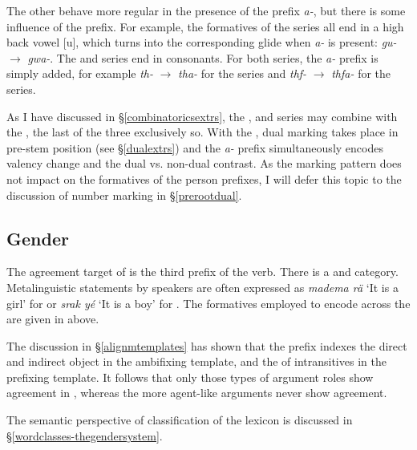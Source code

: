 The other  behave more regular in the presence of the  prefix \emph{a-}, but there is some influence of the  prefix. For example, the formatives of the \Betatwo{} series all end in a high back vowel [u], which turns into the corresponding glide when \emph{a-} is present: \Ssg{} \emph{gu-} $\rightarrow$ \emph{gwa-}. The \Bet{} and \Betatwo{} series end in consonants. For both series, the \emph{a-} prefix is simply added, for example \Stnsg{} \emph{th-} $\rightarrow$ \emph{tha-} for the \Bet{} series and \Stnsg{} \emph{thf-} $\rightarrow$ \emph{thfa-} for the \Betatwo{} series.%

As I have discussed in \S{}\ref{combinatoricsextrs}, the \Bet{}, \Betaone{} and \Gam{} series may combine with the , the last of the three exclusively so. With the , dual marking takes place in pre-stem position (see \S{}\ref{dualextrs}) and the \emph{a-} prefix simultaneously encodes valency change and the dual vs. non-dual contrast. As the marking pattern does not impact on the formatives of the person prefixes, I will defer this topic to the discussion of number marking in \S{}\ref{prerootdual}.

\subsection{Gender} \label{gendersubsec}

The agreement target of  is the third  prefix of the verb. There is a  and   category. Metalinguistic statements by speakers are often expressed as \emph{madema rä} `It is a girl' for  or \emph{srak yé} `It is a boy' for . The formatives employed to encode  across the  are given in  above.%

The discussion in \S{}\ref{alignmtemplates} has shown that the prefix indexes the direct and indirect object in the ambifixing  template, and the  of intransitives in the prefixing template. It follows that only those types of argument roles show agreement in , whereas the more agent-like arguments never show  agreement.%

The semantic perspective of  classification of the  lexicon is discussed in \S{}\ref{wordclasses-thegendersystem}.

